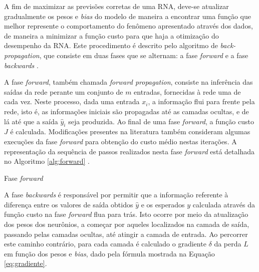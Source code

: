 A fim de maximizar as previsões corretas de uma RNA, deve-se atualizar gradualmente os pesos e \emph{bias} do modelo de maneira a encontrar uma função que melhor represente o comportamento do fenômeno apresentado através dos dados, de maneira a minimizar a função custo para que haja a otimização do desempenho da RNA. Este procedimento é descrito pelo algoritmo de \emph{back-propagation}, que consiste em duas fases que se alternam: a fase \emph{forward} e a fase \emph{backwards} \cite{haykin2009neural}.

A fase \emph{forward}, também chamada \emph{forward propagation}, consiste na inferência das saídas da rede perante um conjunto de $m$ entradas, fornecidas à rede uma de cada vez. Neste processo, dada uma entrada $x_i$, a informação flui para frente  pela rede, isto é, as informações iniciais são propagadas até as camadas ocultas, e de lá até que a saída $\hat{y}_i$ seja produzida. Ao final de uma fase \emph{forward}, a função custo $J$ é calculada. Modificações presentes na literatura também consideram algumas execuções da fase \emph{forward} para obtenção do custo médio nestas iterações. A representação da sequência de passos realizados nesta fase \emph{forward} está detalhada no Algoritmo \ref{alg:forward} \cite{haykin2009neural, goodfellow2016deep}.

\begin{algorithm}
	\caption{Fase \emph{forward}}\label{alg:forward}
\end{algorithm}

A fase \emph{backwards} é responsável por permitir que a informação referente à diferença entre os valores de saída obtidos $\hat{y}$ e os esperados $y$ calculada através da função custo na fase \emph{forward} flua para trás. Isto ocorre por meio da atualização dos pesos dos neurônios, a começar por aqueles localizados na camada de saída, passando pelas camadas ocultas, até atingir a camada de entrada. Ao percorrer este caminho contrário, para cada camada é calculado o gradiente $\delta$ da perda $L$ em função dos pesos e \emph{bias}, dado pela fórmula mostrada na Equação \ref{eq:gradiente}.


